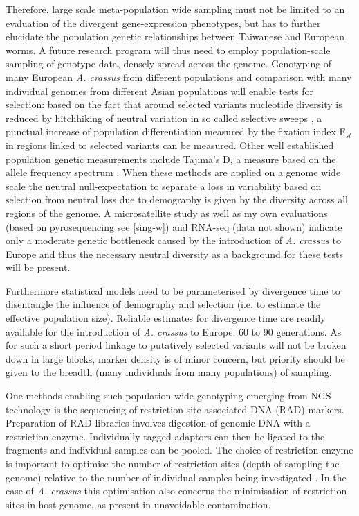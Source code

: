 Therefore, large scale meta-population wide sampling must not be
limited to an evaluation of the divergent gene-expression phenotypes,
but has to further elucidate the population genetic relationships
between Taiwanese and European worms. A future research program will
thus need to employ population-scale sampling of genotype data, densely
spread across the genome. Genotyping of many European
\textit{A. crassus} from different populations and comparison with
many individual genomes from different Asian populations will enable
tests for selection: based on the fact that around selected variants
nucleotide diversity is reduced by hitchhiking of neutral variation in
so called selective sweeps \cite{pmid16251466}, a punctual increase of
population differentiation measured by the fixation index F$_{st}$
\cite{wright1949genetical} in regions linked to selected variants can
be measured. Other well established population genetic measurements
include Tajima's D, a measure based on the allele frequency spectrum
\cite{pmid2513255}. When these methods are applied on a genome wide
scale the neutral null-expectation to separate a loss in variability
based on selection from neutral loss due to demography is given by the
diversity across all regions of the genome. A microsatellite study
\cite{wielgoss_population_2008} as well as my own evaluations (based
on pyrosequencing see \ref{sing-w}) and RNA-seq (data not shown)
indicate only a moderate genetic bottleneck caused by the introduction
of \textit{A. crassus} to Europe and thus the necessary neutral
diversity as a background for these tests will be present.

Furthermore statistical models need to be parameterised by divergence
time to disentangle the influence of demography and selection (i.e. to
estimate the effective population size). Reliable estimates for
divergence time are readily available for the introduction of
\textit{A. crassus} to Europe: 60 to 90 generations. As for such a
short period linkage to putatively selected variants will not be
broken down in large blocks, marker density is of minor concern, but
priority should be given to the breadth (many individuals from many
populations) of sampling.

One methods enabling such population wide genotyping emerging from NGS
technology is the sequencing of restriction-site associated DNA (RAD)
markers. Preparation of RAD libraries involves digestion of genomic
DNA with a restriction enzyme. Individually tagged adaptors can then
be ligated to the fragments and individual samples can be pooled. The
choice of restriction enzyme is important to optimise the number of
restriction sites (depth of sampling the genome) relative to the
number of individual samples being investigated
\cite{pmid18852878}. In the case of \textit{A. crassus} this
optimisation also concerns the minimisation of restriction sites in
host-genome, as present in unavoidable contamination. 


